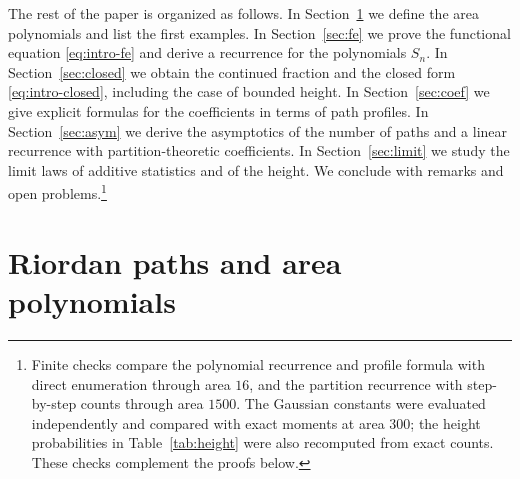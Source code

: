 \documentclass[11pt,reqno]{amsart}
\numberwithin{equation}{section}
\theoremstyle{remark}
\begin{document}
The rest of the paper is organized as follows. In Section~\ref{sec:def} we define the area
polynomials and list the first examples. In Section~\ref{sec:fe} we prove the functional
equation \eqref{eq:intro-fe} and derive a recurrence for the polynomials $S_n$. In
Section~\ref{sec:closed} we obtain the continued fraction and the closed form
\eqref{eq:intro-closed}, including the case of bounded height. In Section~\ref{sec:coef}
we give explicit formulas for the coefficients in terms of path profiles. In
Section~\ref{sec:asym} we derive the asymptotics of the number of paths and a linear
recurrence with partition-theoretic coefficients. In Section~\ref{sec:limit} we study the
limit laws of additive statistics and of the height. We conclude with remarks and open
problems.\footnote{Finite checks compare the polynomial recurrence and profile formula
with direct enumeration through area $16$, and the partition recurrence with step-by-step
counts through area $1500$. The Gaussian constants were evaluated independently and
compared with exact moments at area $300$; the height probabilities in
Table~\ref{tab:height} were also recomputed from exact counts. These checks complement
the proofs below.}

\section{Riordan paths and area polynomials}\label{sec:def}
\end{document}
